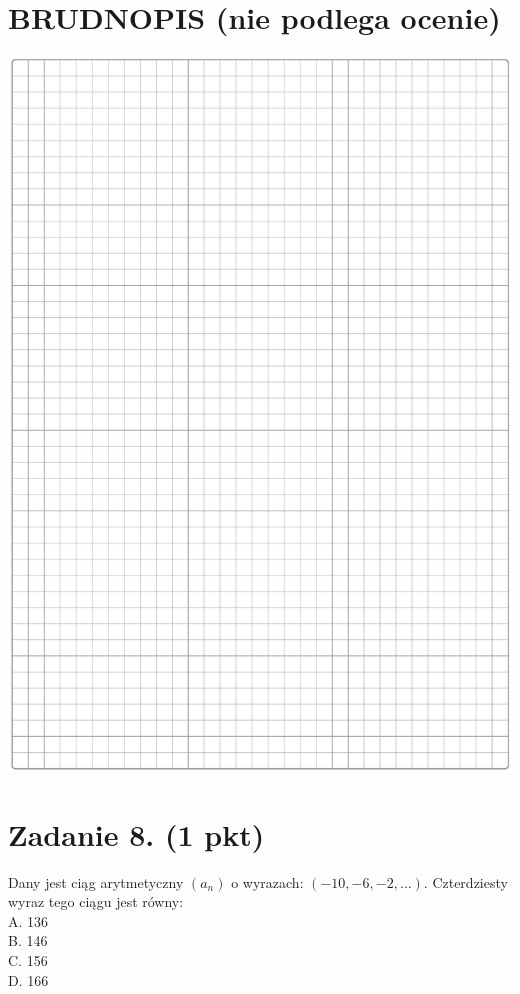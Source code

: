 \documentclass[10pt]{article}
\begin{document}
\section*{BRUDNOPIS (nie podlega ocenie)}
\begin{center}
\includegraphics[max width=\textwidth]{2024_11_21_fd9e49107d1ddcec5cd8g-03}
\end{center}

\section*{Zadanie 8. (1 pkt)}
Dany jest ciąg arytmetyczny \(\left(a_{n}\right)\) o wyrazach: \((-10,-6,-2, \ldots)\). Czterdziesty wyraz tego ciągu jest równy:\\
A. 136\\
B. 146\\
C. 156\\
D. 166
\end{document}
